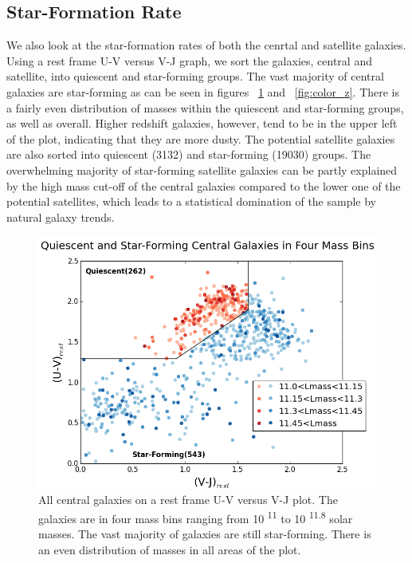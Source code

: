 \documentclass[apj]{emulateapj}
\begin{document}
\subsection{Star-Formation Rate}

We also look at the star-formation rates of both the cenrtal and satellite galaxies. Using a rest frame U-V versus V-J graph, we sort the galaxies, central and satellite, into quiescent and star-forming groups. The vast majority of central galaxies are star-forming as can be seen in figures ~\ref{fig:color_mass} and ~\ref{fig:color_z}. There is a fairly even distribution of masses within the quiescent and star-forming groups, as well as overall. Higher redshift galaxies, however, tend to be in the upper left of the plot, indicating that they are more dusty. The potential satellite galaxies are also sorted into quiescent (3132) and star-forming (19030) groups. The overwhelming majority of star-forming satellite galaxies can be partly explained by the high mass cut-off of the central galaxies compared to the lower one of the potential satellites, which leads to a statistical domination of the sample by natural galaxy trends. 

\begin{figure}
\centering
\graphicspath{{C:/3d_hst/2015_finals/Colors/}}
\includegraphics[width=\linewidth]{temp_color_final}
\caption{\footnotesize All central galaxies on a rest frame U-V versus V-J plot. The galaxies are in four mass bins ranging from 10 \textsuperscript{11} to 10 \textsuperscript{11.8} solar masses. The vast majority of galaxies are still star-forming. There is an even distribution of masses in all areas of the plot.}
\label{fig:color_mass}
\end{figure}
\end{document}
